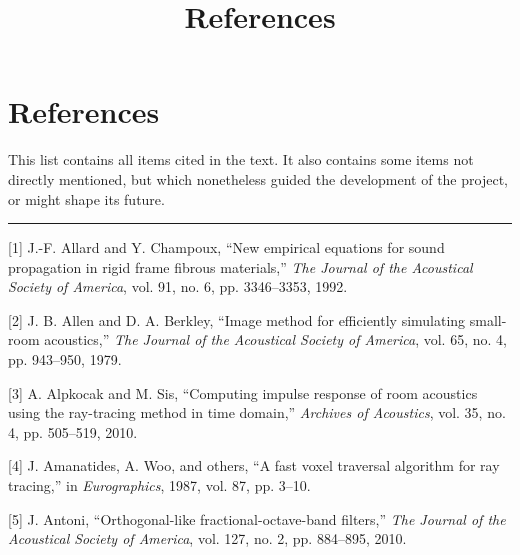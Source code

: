 \documentclass[]{scrreprt}
\title{References}
\date{}
\begin{document}
\maketitle

\chapter*{References}\label{references}

This list contains all items cited in the text. It also contains some
items not directly mentioned, but which nonetheless guided the
development of the project, or might shape its future.

\begin{center}\rule{0.5\linewidth}{\linethickness}\end{center}

\noindent
\vspace{-2em} \setlength{\parindent}{-0.5in}
\setlength{\leftskip}{0.5in} \setlength{\parskip}{15pt}

\let\oldhypertarget\hypertarget

\renewcommand{\hypertarget}[2]{%
    \oldhypertarget{#1}{#2}%
}

\hypertarget{refs}{}
\hypertarget{ref-allardux5fnewux5f1992}{}
{[}1{]} J.-F. Allard and Y. Champoux, ``New empirical equations for
sound propagation in rigid frame fibrous materials,'' \emph{The Journal
of the Acoustical Society of America}, vol. 91, no. 6, pp. 3346--3353,
1992.

\hypertarget{ref-allenux5fimageux5f1979}{}
{[}2{]} J. B. Allen and D. A. Berkley, ``Image method for efficiently
simulating small-room acoustics,'' \emph{The Journal of the Acoustical
Society of America}, vol. 65, no. 4, pp. 943--950, 1979.

\hypertarget{ref-alpkocakux5fcomputingux5f2010}{}
{[}3{]} A. Alpkocak and M. Sis, ``Computing impulse response of room
acoustics using the ray-tracing method in time domain,'' \emph{Archives
of Acoustics}, vol. 35, no. 4, pp. 505--519, 2010.

\hypertarget{ref-amanatidesux5ffastux5f1987}{}
{[}4{]} J. Amanatides, A. Woo, and others, ``A fast voxel traversal
algorithm for ray tracing,'' in \emph{Eurographics}, 1987, vol. 87, pp.
3--10.

\hypertarget{ref-antoniux5forthogonal-likeux5f2010}{}
{[}5{]} J. Antoni, ``Orthogonal-like fractional-octave-band filters,''
\emph{The Journal of the Acoustical Society of America}, vol. 127, no.
2, pp. 884--895, 2010.
\end{document}
